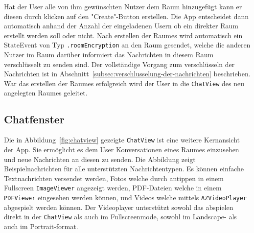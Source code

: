     Hat der User alle von ihm gewünschten Nutzer dem Raum hinzugefügt kann er diesen durch klicken auf den "Create"-Button erstellen.
    Die App entscheidet dann automatisch anhand der Anzahl der eingeladenen Usern ob ein direkter Raum erstellt werden soll oder nicht.
    Nach erstellen der Raumes wird automatisch ein StateEvent von Typ \texttt{.roomEncryption} an den Raum gesendet, welche die anderen Nutzer im Raum darüber informiert das Nachrichten in diesem Raum verschlüsselt zu senden sind.
    Der vollständige Vorgang zum verschlüsseln der Nachrichten ist in Abschnitt~\ref{subsec:verschlusselung-der-nachrichten} beschrieben.
    War das erstellen der Raumes erfolgreich wird der User in die \texttt{ChatView} des neu angelegten Raumes geleitet.

    \newpage
    \subsection{Chatfenster}
    Die in Abbildung~\ref{fig:chatview} gezeigte \texttt{ChatView} ist eine weitere Kernansicht der App.
    Sie ermöglicht es dem User Konversationen eines Raumes einzusehen und neue Nachrichten an diesen zu senden.
    Die Abbildung zeigt Beispielnachrichten für alle unterstützten Nachrichtentypen.
    Es können einfache Textnachrichten versendet werden, Fotos welche durch antippen in einem Fullscreen \texttt{ImageViewer} angezeigt werden,
    PDF-Dateien welche in einem \texttt{PDFViewer} eingesehen werden können, und Videos welche mittels \texttt{AZVideoPlayer} abgespielt werden können.
    Der Videoplayer unterstützt sowohl das abspielen direkt in der \texttt{ChatView} als auch im Fullscreenmode, sowohl im Landscape- als auch im Portrait-format.

